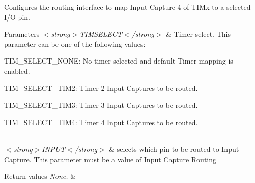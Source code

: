 Configures the routing interface to map Input Capture 4 of T\-I\-Mx to a selected I/\-O pin. 


\begin{DoxyParams}{Parameters}
{\em $<$strong$>$\-T\-I\-M\-S\-E\-L\-E\-C\-T$<$/strong$>$} & Timer select. This parameter can be one of the following values\-: \begin{DoxyItemize}
\item T\-I\-M\-\_\-\-S\-E\-L\-E\-C\-T\-\_\-\-N\-O\-N\-E\-: No timer selected and default Timer mapping is enabled. \item T\-I\-M\-\_\-\-S\-E\-L\-E\-C\-T\-\_\-\-T\-I\-M2\-: Timer 2 Input Captures to be routed. \item T\-I\-M\-\_\-\-S\-E\-L\-E\-C\-T\-\_\-\-T\-I\-M3\-: Timer 3 Input Captures to be routed. \item T\-I\-M\-\_\-\-S\-E\-L\-E\-C\-T\-\_\-\-T\-I\-M4\-: Timer 4 Input Captures to be routed. \end{DoxyItemize}
\\
\hline
{\em $<$strong$>$\-I\-N\-P\-U\-T$<$/strong$>$} & selects which pin to be routed to Input Capture. This parameter must be a value of \hyperlink{group___r_i___input_capture_routing}{Input Capture Routing} \\
\hline
\end{DoxyParams}

\begin{DoxyRetVals}{Return values}
{\em None.} & \\
\hline
\end{DoxyRetVals}
